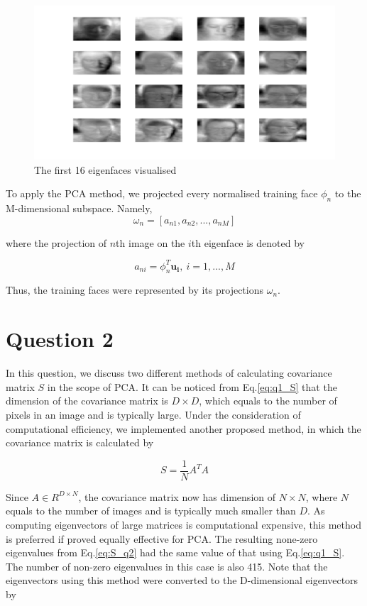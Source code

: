 \documentclass[10pt,twocolumn,letterpaper]{article}
\begin{document}
\begin{figure}
	\begin{center}
		\includegraphics[width=0.8\linewidth]{q1_eigenfaces}
		\caption{The first 16 eigenfaces visualised}
		\label{fig:eigFaces}
	\end{center}
\end{figure}

To apply the PCA method, we projected every normalised training face $\phi_n$ to the M-dimensional subspace. Namely,
\begin{equation}
\omega_n = [a_{n1}, a_{n2}, ..., a_{nM}]
\label{eq:project}
\end{equation}

where the projection of $n$th image on the $i$th eigenface is denoted by

\begin{equation}
a_{ni} = \phi_n^T \boldsymbol{u_i}, ~  i = 1,...,M
\label{eq:project_a}
\end{equation}


Thus, the training faces were represented by its projections $\omega_n$. \\


\section{Question 2}
In this question, we discuss two different methods of calculating covariance matrix $S$ in the scope of PCA. It can be noticed from Eq.\ref{eq:q1_S} that the dimension of the covariance matrix is $D\times D$, which equals to the number of pixels in an image and is typically large. Under the consideration of computational efficiency, we implemented another proposed method, in which the covariance matrix is calculated by

\begin{equation}
S = \frac{1}{N} A^T A
\label{eq:S_q2}
\end{equation}

Since $A \in R^{D \times N}$, the covariance matrix now has dimension of $N \times N$, where $N$ equals to the number of images and is typically much smaller than $D$. As computing eigenvectors of large matrices is computational expensive, this method is preferred if proved equally effective for PCA. The resulting none-zero eigenvalues from Eq.\ref{eq:S_q2} had the same value of that using Eq.\ref{eq:q1_S}. The number of non-zero eigenvalues in this case is also 415. Note that the eigenvectors using this method were converted to the D-dimensional eigenvectors by 
\end{document}
